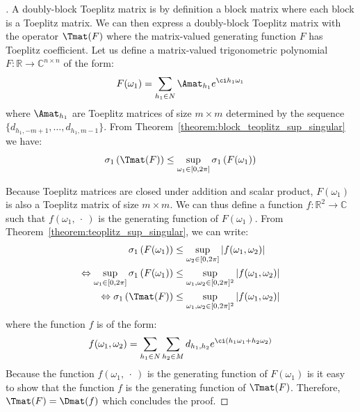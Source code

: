 \begin{proof}[]
A doubly-block Toeplitz matrix is by definition a block matrix where each block is a Toeplitz matrix. We can then express a doubly-block Toeplitz matrix with the operator $\Tmat(F)$ where the matrix-valued generating function $F$ has Toeplitz coefficient. Let us define a matrix-valued trigonometric polynomial $F:\mathbb{R}\rightarrow\mathbb{C}^{n \times n}$ of the form:
\begin{equation}
    F(\omega_1) = \sum_{h_1 \in N} \Amat_{h_1}e^{\ci h_1\omega_1}
\end{equation}
where $\Amat_{h_1}$ are Toeplitz matrices of size $m \times m$ determined by the sequence $\{d_{h_1, -m+1}, \dots, d_{h_1, m-1} \}$. 
From Theorem~\ref{theorem:block_teoplitz_sup_singular} we have:
\begin{equation}
\sigma_1\left(\Tmat(F) \right) \leq \sup_{\omega_1 \in [0,2\pi] } \sigma_{1}\left( F(\omega_1) \right) \label{equation:th_bound_block_toeplitz}
\end{equation}

Because Toeplitz matrices are closed under addition and scalar product, $F(\omega_1)$ is also a Toeplitz matrix of size $m \times m$. 
We can thus define a function $f:\mathbb{R}^{2} \rightarrow \mathbb{C}$ such that $f(\omega_1,\ \cdot\ )$ is the generating function of $F(\omega_1)$. From Theorem~\ref{theorem:teoplitz_sup_singular}, we can write:
\begin{align}
    \sigma_{1}\left( F(\omega_1) \right) &\leq \sup_{\omega_2 \in [0,2\pi]} \left| f(\omega_1, \omega_2) \right| \\
    \Leftrightarrow \sup_{\omega_1 \in [0,2\pi]} \sigma_{1}\left( F(\omega_1) \right) &\leq  \sup_{\omega_1, \omega_2 \in [0,2\pi]^2} \left| f(\omega_1, \omega_2) \right| \\
    \Leftrightarrow \sigma_1\left(\Tmat(F) \right) &\leq \sup_{\omega_1, \omega_2 \in [0,2\pi]^2} \left| f(\omega_1, \omega_2) \right|
\end{align}
where the function $f$ is of the form:
\begin{equation}
f(\omega_1,\omega_2) = \sum_{h_1 \in N} \sum_{h_2 \in M} d_{h_1, h_2} e^{\ci \left( h_1\omega_1 + h_2 \omega_2\right)}
\end{equation}
Because the function $f(\omega_1,\ \cdot\ )$ is the generating function of $F(\omega_1)$ is it easy to show that the function $f$ is the generating function of $\Tmat(F)$. Therefore, $\Tmat(F) = \Dmat(f)$ which concludes the proof. 
\end{proof}


